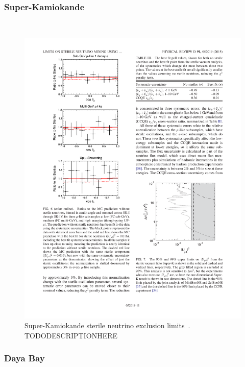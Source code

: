 \documentclass[aps,prd,twocolumn,nofootinbib]{revtex4-1}
\begin{document}
\subsubsection{Super-Kamiokande}

~\cite{SuperK}

\begin{figure}[H]
 \centering
 \includegraphics[width=1\columnwidth]{../figures/sk1.pdf}
 \caption{Super-Kamiokande sterile neutrino exclusion limits~\cite{SuperK}. TODODESCRIPTIONHERE}
 \label{fig:SuperK}
\end{figure}

\subsubsection{Daya Bay}

~\cite{DayaBay}
\end{document}
